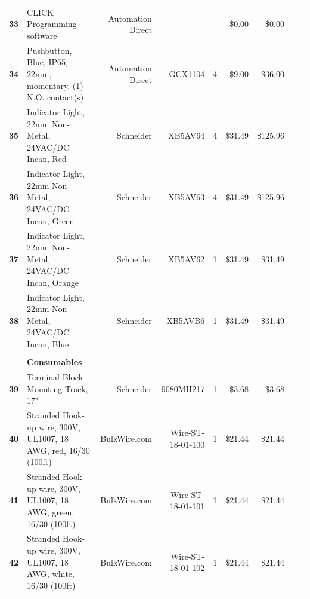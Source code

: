 \begin{table}[!htp]
{\begin{tabular}{llrrrrrrr}
			\textbf{33}    & CLICK Programming software                                                       & Automation Direct &                   &          & \$0.00   & \$0.00         \\
			\textbf{34}    & Pushbutton, Blue, IP65, 22mm, momentary, (1) N.O. contact(s)                     & Automation Direct & GCX1104           & 4        & \$9.00   & \$36.00        \\
			\textbf{35}    & Indicator Light, 22mm Non-Metal, 24VAC/DC Incan, Red                             & Schneider         & XB5AV64           & 4        & \$31.49  & \$125.96       \\
			\textbf{36}    & Indicator Light, 22mm Non-Metal, 24VAC/DC Incan, Green                           & Schneider         & XB5AV63           & 4        & \$31.49  & \$125.96       \\
			\textbf{37}    & Indicator Light, 22mm Non-Metal, 24VAC/DC Incan, Orange                          & Schneider         & XB5AV62           & 1        & \$31.49  & \$31.49        \\
			\textbf{38}    & Indicator Light, 22mm Non-Metal, 24VAC/DC Incan, Blue                            & Schneider         & XB5AVB6           & 1        & \$31.49  & \$31.49        \\
			\textbf{}      & \textbf{}                                                                        &                   &                   &          &          &                \\
			\textbf{}      & \textbf{Consumables}                                                             &                   &                   &          &          &                \\
			\textbf{39}    & Terminal Block Mounting Track, 17"                                               & Schneider         & 9080MH217         & 1        & \$3.68   & \$3.68         \\
			\textbf{40}    & Stranded Hook-up wire, 300V, UL1007, 18 AWG, red, 16/30 (100ft)                  & BulkWire.com      & Wire-ST-18-01-100 & 1        & \$21.44  & \$21.44        \\
			\textbf{41}    & Stranded Hook-up wire, 300V, UL1007, 18 AWG, green, 16/30 (100ft)                & BulkWire.com      & Wire-ST-18-01-101 & 1        & \$21.44  & \$21.44        \\
			\textbf{42}    & Stranded Hook-up wire, 300V, UL1007, 18 AWG, white, 16/30 (100ft)                & BulkWire.com      & Wire-ST-18-01-102 & 1        & \$21.44  & \$21.44        \\

\end{tabular}}
\end{table}
